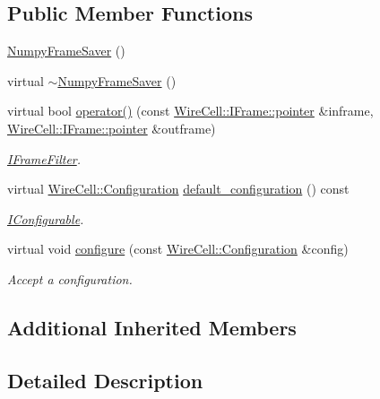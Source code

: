 \subsection*{Public Member Functions}
\begin{DoxyCompactItemize}
\item 
\hyperlink{class_wire_cell_1_1_sio_1_1_numpy_frame_saver_a345877e59aafbe4b5246d1017dd20684}{Numpy\+Frame\+Saver} ()
\item 
virtual \hyperlink{class_wire_cell_1_1_sio_1_1_numpy_frame_saver_a4aa0d5bf10e83e8004da85ee3822945e}{$\sim$\+Numpy\+Frame\+Saver} ()
\item 
virtual bool \hyperlink{class_wire_cell_1_1_sio_1_1_numpy_frame_saver_aa4e56c63747bea244fd47f07b0d59303}{operator()} (const \hyperlink{class_wire_cell_1_1_i_data_aff870b3ae8333cf9265941eef62498bc}{Wire\+Cell\+::\+I\+Frame\+::pointer} \&inframe, \hyperlink{class_wire_cell_1_1_i_data_aff870b3ae8333cf9265941eef62498bc}{Wire\+Cell\+::\+I\+Frame\+::pointer} \&outframe)
\begin{DoxyCompactList}\small\item\em \hyperlink{class_wire_cell_1_1_i_frame_filter}{I\+Frame\+Filter}. \end{DoxyCompactList}\item 
virtual \hyperlink{namespace_wire_cell_a9f705541fc1d46c608b3d32c182333ee}{Wire\+Cell\+::\+Configuration} \hyperlink{class_wire_cell_1_1_sio_1_1_numpy_frame_saver_ab6125a2331cd69cd1f4a8d071114f5be}{default\+\_\+configuration} () const
\begin{DoxyCompactList}\small\item\em \hyperlink{class_wire_cell_1_1_i_configurable}{I\+Configurable}. \end{DoxyCompactList}\item 
virtual void \hyperlink{class_wire_cell_1_1_sio_1_1_numpy_frame_saver_a19410b5b0a435a8269e2fa5e27127016}{configure} (const \hyperlink{namespace_wire_cell_a9f705541fc1d46c608b3d32c182333ee}{Wire\+Cell\+::\+Configuration} \&config)
\begin{DoxyCompactList}\small\item\em Accept a configuration. \end{DoxyCompactList}\end{DoxyCompactItemize}
\subsection*{Additional Inherited Members}


\subsection{Detailed Description}


